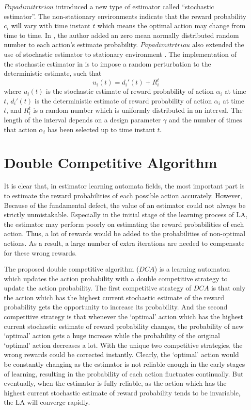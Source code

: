 $Papadimitrtriou$ \cite{vasilakos1995new} introduced a new type of estimator called “stochastic estimator”. The non-stationary environments indicate that the reward probability $c_i$ will vary with time instant $t$ which means the optimal action may change from time to time. In \cite{vasilakos1995new}, the author added an zero mean normally distributed random number to each action’s estimate probability. $Papadimitrtriou$ also extended the use of stochastic estimator to stationary environment \cite{papadimitriou2004new}. The implementation of the stochastic estimator in \cite{papadimitriou2004new} is to impose a random perturbation to the deterministic estimate, such that
\begin{equation}
{u_i}(t) = d_i'(t) + R_i^t
\end{equation}
where $u_i(t)$ is the stochastic estimate of reward probability of action $\alpha_i$ at time $t$, $d_i'(t)$ is the deterministic estimate of reward probability of action $\alpha_i$ at time $t$, and $R_i^t$ is a random number which is uniformly distributed in an interval. The length of the interval depends on a design parameter $\gamma$ and the number of times that action $\alpha_i$ has been selected up to time instant $t$.

\section{Double Competitive Algorithm}
\label{sec:2}
It is clear that, in estimator learning automata fields, the most important part is to estimate the reward probabilities of each possible action accurately. However, Because of the fundamental defect, the value of an estimator could not always be strictly unmistakable. Especially in the initial stage of the learning process of LA, the estimator may perform poorly on estimating the reward probabilities of each action. Thus, a lot of rewards would be added to the probabilities of non-optimal actions. As a result, a large number of extra iterations are needed to compensate for these wrong rewards.

The proposed double competitive algorithm ($DCA$) is a learning automaton which updates the action probability with a double competitive strategy to update the action probability. The first competitive strategy of $DCA$ is that only the action which has the highest current stochastic estimate of the reward probability gets the opportunity to increase its probability. And the second competitive strategy is that whenever the ‘optimal’ action which has the highest current stochastic estimate of reward probability changes, the probability of new ‘optimal’ action gets a huge increase while the probability of the original ‘optimal’ action decreases a lot. With the unique two competitive strategies, the wrong rewards could be corrected instantly. Clearly, the ‘optimal’ action would be constantly changing as the estimator is not reliable enough in the early stages of learning, resulting in the probability of each action fluctuates continually. But eventually, when the estimator is fully reliable, as the action which has the highest current stochastic estimate of reward probability tends to be invariable, the LA will converge rapidly.

